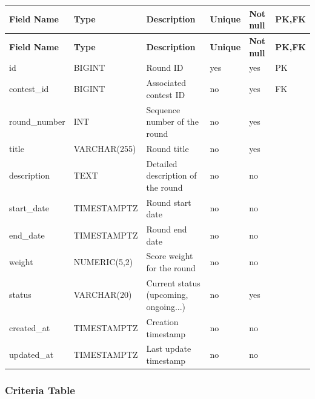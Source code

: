 \vspace{0.5em}
\renewcommand{\arraystretch}{1.15}
\setlength{\tabcolsep}{4pt}
\small
\begin{longtable}{|>{\raggedright\arraybackslash}p{}|>{\raggedright\arraybackslash}p{}|>{\raggedright\arraybackslash}p{}|>{\centering\arraybackslash}p{}|>{\centering\arraybackslash}p{}|>{\centering\arraybackslash}p{}|}
\hline
\textbf{Field Name} & \textbf{Type} & \textbf{Description} & \textbf{Unique} & \textbf{Not null} & \textbf{PK,FK} \\
\hline
\endfirsthead
\textbf{Field Name} & \textbf{Type} & \textbf{Description} & \textbf{Unique} & \textbf{Not null} & \textbf{PK,FK} \\
\hline
\endhead
id & BIGINT & Round ID & yes & yes & PK \\
\hline
contest\_id & BIGINT & Associated contest ID & no & yes & FK \\
\hline
round\_number & INT & Sequence number of the round & no & yes & \\
\hline
title & VARCHAR(255) & Round title & no & yes & \\
\hline
description & TEXT & Detailed description of the round & no & no & \\
\hline
start\_date & TIMESTAMPTZ & Round start date & no & no & \\
\hline
end\_date & TIMESTAMPTZ & Round end date & no & no & \\
\hline
weight & NUMERIC(5,2) & Score weight for the round & no & no & \\
\hline
status & VARCHAR(20) & Current status (upcoming, ongoing...) & no & yes & \\
\hline
created\_at & TIMESTAMPTZ & Creation timestamp & no & no & \\
\hline
updated\_at & TIMESTAMPTZ & Last update timestamp & no & no & \\
\hline
\end{longtable}

\vspace{1em}
\subsubsection{Criteria Table}
\label{subsubsec:criteria-table}

